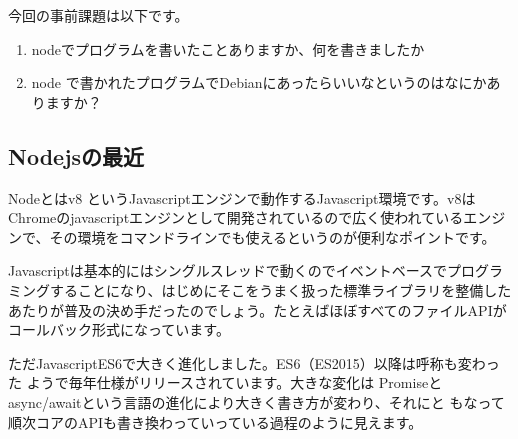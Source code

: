 \documentclass[mingoth,a4paper]{jsarticle}
\begin{document}


今回の事前課題は以下です。

\begin{enumerate}
 \item nodeでプログラムを書いたことありますか、何を書きましたか
 \item node で書かれたプログラムでDebianにあったらいいなというのはなにかありますか？
\end{enumerate}


\begin{multicols}{2}
{\small
% 
}
\end{multicols}

%
%
%
%




\subsection{Nodejsの最近}

Nodeとはv8 というJavascriptエンジンで動作するJavascript環境です\cite{nodejsorg}。v8は
Chromeのjavascriptエンジンとして開発されているので広く使われているエンジ
ンで、その環境をコマンドラインでも使えるというのが便利なポイントです。

Javascriptは基本的にはシングルスレッドで動くのでイベントベースでプログラ
ミングすることになり、はじめにそこをうまく扱った標準ライブラリを整備した
あたりが普及の決め手だったのでしょう。たとえばほぼすべてのファイルAPIが
コールバック形式になっています。

ただJavascriptES6で大きく進化しました。ES6（ES2015）以降は呼称も変わった
ようで毎年仕様がリリースされています\cite{nodejs-es6}。大きな変化は
Promiseとasync/awaitという言語の進化により大きく書き方が変わり、それにと
もなって順次コアのAPIも書き換わっていっている過程のように見えます。
\end{document}

